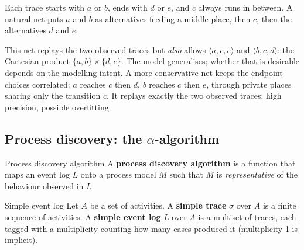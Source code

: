 Each trace starts with $a$ or $b$, ends with $d$ or $e$, and $c$ always runs in between. A natural net puts $a$ and $b$ as alternatives feeding a middle place, then $c$, then the alternatives $d$ and $e$:
\begin{center}
\end{center}
This net replays the two observed traces but \emph{also} allows $\langle a, c, e\rangle$ and $\langle b, c, d\rangle$: the Cartesian product $\{a, b\} \times \{d, e\}$. The model generalises; whether that is desirable depends on the modelling intent. A more conservative net keeps the endpoint choices correlated: $a$ reaches $c$ then $d$, $b$ reaches $c$ then $e$, through private places sharing only the transition $c$. It replays exactly the two observed traces: high precision, possible overfitting.

\subsection{Process discovery: the $\alpha$-algorithm}

\begin{definitionbox}{Process discovery algorithm}
A \textbf{process discovery algorithm} is a function that maps an event log $L$ onto a process model $M$ such that $M$ is \emph{representative} of the behaviour observed in $L$.
\end{definitionbox}

\begin{definitionbox}{Simple event log}
Let $A$ be a set of activities. A \textbf{simple trace} $\sigma$ over $A$ is a finite sequence of activities. A \textbf{simple event log} $L$ over $A$ is a multiset of traces, each tagged with a multiplicity counting how many cases produced it (multiplicity 1 is implicit).
\end{definitionbox}

